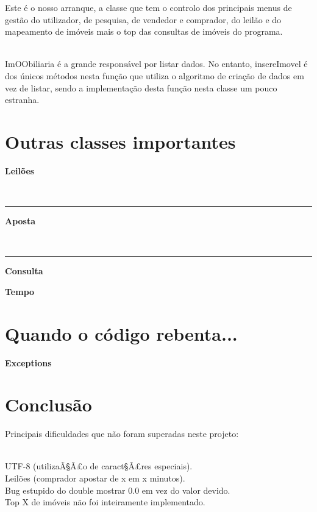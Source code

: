 \documentclass[12pt]{article}
\newenvironment{code}                    
{\textbf{
} \hspace{1cm} \hrulefill \\ 
\smallskip 
\begin{center}
\begin{minipage}{0.9\textwidth} 
\begin{alltt}\small}
{\end{alltt}
\end{minipage}
\end{center}
\hrule\smallskip
}
\begin{document}
Este é o nosso arranque, a classe que tem o controlo dos principais menus de gestão do utilizador, de pesquisa, de vendedor e comprador, do leilão e do mapeamento de imóveis mais o top das consultas de imóveis do programa.

~\\
ImOObiliaria é a grande responsável por listar dados. No entanto, insereImovel é dos únicos métodos nesta função que utiliza o algoritmo de criação de dados em vez de listar, sendo a implementação desta função nesta classe um pouco estranha.
~\\


\pagebreak
\section{Outras classes importantes}

\textbf{Leilões}

\begin{code}

\end{code}


\pagebreak

\textbf{Aposta}

\begin{code}

\end{code}

\textbf{Consulta}

\textbf{Tempo}

\pagebreak

\section{Quando o código rebenta...}

\textbf{Exceptions}
\pagebreak

 
\section{Conclusão}

Principais dificuldades que não foram superadas neste projeto:

~\\
UTF-8 (utilizaÃ§Ã£o de caract§Ã£res especiais).
~\\
Leilões (comprador apostar de x em x minutos).
~\\
Bug estupido do double mostrar 0.0 em vez do valor devido.
~\\
Top X de imóveis não foi inteiramente implementado.
~\\
\end{document}
